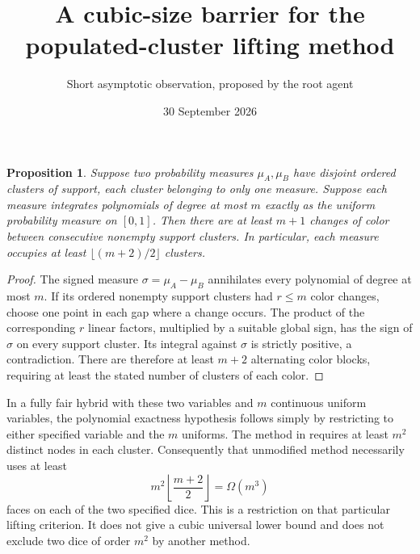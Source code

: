 \documentclass[11pt]{article}
\title{A cubic-size barrier for the populated-cluster lifting method}
\author{Short asymptotic observation, proposed by the root agent}
\date{30 September 2026}
\newtheorem{proposition}{Proposition}
\begin{document}
\maketitle
\begin{proposition}
Suppose two probability measures $\mu_A,\mu_B$ have disjoint ordered
clusters of support, each cluster belonging to only one measure.
Suppose each measure integrates polynomials of degree at most $m$
exactly as the uniform probability measure on $[0,1]$.
Then there are at least $m+1$ changes of color between consecutive
nonempty support clusters. In particular, each measure occupies at
least $\lfloor(m+2)/2\rfloor$ clusters.
\end{proposition}
\begin{proof}
The signed measure $\sigma=\mu_A-\mu_B$ annihilates every polynomial
of degree at most $m$. If its ordered nonempty support clusters had
$r\le m$ color changes, choose one point in each gap where a change
occurs. The product of the corresponding $r$ linear factors, multiplied
by a suitable global sign, has the sign of $\sigma$ on every support
cluster. Its integral against $\sigma$ is strictly positive, a
contradiction. There are therefore at least $m+2$ alternating color
blocks, requiring at least the stated number of clusters of each color.
\end{proof}

In a fully fair hybrid with these two variables and $m$ continuous
uniform variables, the polynomial exactness hypothesis follows simply
by restricting to either specified variable and the $m$ uniforms.
The method in  requires
at least $m^2$ distinct nodes in each cluster. Consequently that
unmodified method necessarily uses at least
\[
 m^2\left\lfloor\frac{m+2}{2}\right\rfloor=\Omega(m^3)
\]
faces on each of the two specified dice. This is a restriction on that
particular lifting criterion. It does not give a cubic universal lower
bound and does not exclude two dice of order $m^2$ by another method.
\end{document}
